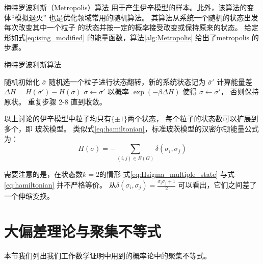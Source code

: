 梅特罗波利斯（Metropolis）算法\cite{metropolis1953equation}
用于产生伊辛模型的样本。此外，该算法的变体“模拟退火”
\cite{pincus1970monte} 也是优化领域常用的随机算法。
其算法从系统一个随机的状态出发每次改变其中一个粒子
的状态并按一定的概率接受改变或保持原来的状态。
给定形如式\eqref{eq:ising_modified}
的能量函数，算法\ref{alg:Metropolis}
给出了\gls{metropolis} 的步骤。

\begin{algorithm}
  \caption{梅特罗波利斯算法}\label{alg:Metropolis}
  \begin{algorithmic}[1]
    \STATE 随机初始化 $\bar{\sigma}$
    \STATE 随机选一个粒子进行状态翻转，新的系统状态记为 $\bar{\sigma}'$ 
    \STATE 计算能量差 $\Delta H= H(\bar{\sigma}') - H(\bar{\sigma})$
    \STATE $\bar{\sigma} \leftarrow \bar{\sigma}'$
    \ELSE
    \STATE 以概率 $\exp(-\beta \Delta H)$ 
    使得 $\bar{\sigma} \leftarrow \bar{\sigma}'$，
    否则保持原状。 
    \ENDIF
    \STATE 重复步骤 2-8 直到收敛。
\end{algorithmic}  
\end{algorithm}

以上讨论的伊辛模型中粒子均只有$\{\pm 1\}$两个状态，
每个粒子的状态数可以扩展到多个，即 玻茨模型\cite{potts1952some}。
类似式\eqref{eq:hamiltonian}，标准玻茨模型的汉密尔顿能量公式为：
\begin{equation}\label{eq:Hsigma_multiple_state}
  H(\sigma) = -\sum_{(i,j) \in E(G)}\delta(\sigma_i, \sigma_j)
\end{equation}
\begin{remark}\label{rem:equivalence_H_energy}
需要注意的是，在状态数$k=2$的情形
式\eqref{eq:Hsigma_multiple_state} 
与式\eqref{eq:hamiltonian}
并不严格等价。
从$\delta(\sigma_i, \sigma_j) = \frac{\sigma_i \sigma_j + 1}{2}$
可以看出，它们之间差了一个伸缩变换。
\end{remark}
\section{大偏差理论与聚集不等式}
本节我们列出我们工作数学证明中用到的概率论中的聚集不等式。

